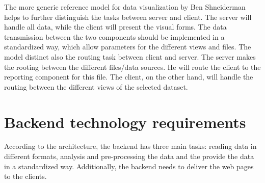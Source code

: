 \documentclass[american,a4paper,oneside,,tablecaptionabove]{scrbook}
\begin{document}
The more generic reference model for data visualization by Ben
Shneiderman helps to further distinguish the tasks between server and
client. The server will handle all data, while the client will present
the visual forms. The data transmission between the two components
should be implemented in a standardized way, which allow parameters for
the different views and files. The model distinct also the routing task
between client and server. The server makes the rooting between the
different files/data sources. He will route the client to the reporting
component for this file. The client, on the other hand, will handle the
routing between the different views of the selected dataset.

\section{Backend technology
requirements}\label{backend-technology-requirements}

According to the architecture, the backend has three main tasks: reading
data in different formats, analysis and pre-processing the data and the
provide the data in a standardized way. Additionally, the backend needs
to deliver the web pages to the clients.
\end{document}
